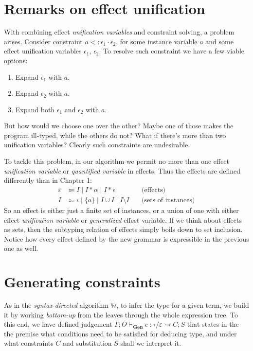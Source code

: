 \documentclass[declaration,shortabstract]{iithesis}
\theoremstyle{definition} \newtheorem{definition}{Definition}[section]
\newcommand{\gens}[6][\Gamma;\Theta]{\ensuremath{{{#1} \vdash_\textbf{Gen} {#2} \: : {#3}/{#4}} \rightsquigarrow {#5};{#6}}}
\begin{document}
\section{Remarks on effect unification}
With combining effect \textit{unification variables} and constraint solving, a problem arises.
Consider constraint $a <: \epsilon_1 \cdot \epsilon_2$,
for some instance variable $a$ and some effect unification variables $\epsilon_1$, $\epsilon_2$.
To resolve such constraint we have a few viable options:
\begin{enumerate}
    \item Expand $\epsilon_1$ with $a$.
    \item Expand $\epsilon_2$ with $a$.
    \item Expand both $\epsilon_1$ and $\epsilon_2$ with $a$.
\end{enumerate}
But how would we choose one over the other? Maybe one of those makes the program ill-typed, while the others do not? What if there's more than two unification variables? Clearly such constraints are undesirable.

To tackle this problem, in our algorithm we permit no more than one effect
\textit{unification variable} or \textit{quantified variable} in effects.
Thus the effects are defined differently than in Chapter 1:
\begin{align*} 
    \varepsilon & \Coloneqq
    I \mid 
    I * \alpha \mid 
    I * \epsilon  &  \text{(effects)}
\\
    I & \Coloneqq \iota \mid \{a\} \mid I \cup I \mid I \setminus I
    \quad & \text{(sets of instances)}
\end{align*}
So an effect is either just a finite set of instances, or a union of one with either effect \textit{unification variable} or \textit{generalized} effect variable.
If we think about effects as sets,
then the subtyping relation of effects simply boils down to set inclusion.
Notice how every effect defined by the new grammar is expressible in the previous one as well.

\section{Generating constraints}
As in the \textit{syntax-directed} algorithm $\mathbb{W}$, to infer the type for a given term,
we build it by working \textit{bottom-up} from the leaves through the whole expression tree.
To this end, we have defined judgement $\gens{e}{\tau}{\varepsilon}{C}{S}$ that
states in the the premise what conditions need to be satisfied for deducing type, 
and under what constraints $C$ and substitution $S$ shall we interpret it.
\end{document}
